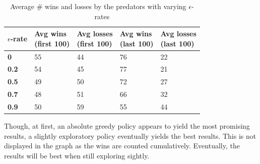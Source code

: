 \begin{table}[H]
\begin{center}
\begin{tabular}{| l | l | l | l | l |}
\hline
\parbox{2cm}{\textbf{$\epsilon$-rate}} & \parbox{2cm}{\textbf{Avg wins \\ (first 100)}} & \parbox{2cm}{\textbf{Avg losses \\ (first 100)}} & \parbox{2cm}{\textbf{Avg wins \\ (last 100)}} & \parbox{2cm}{\textbf{Avg losses \\ (last 100)}} \\
\hline
\textbf{0} & 55 & 44 & 76 & 22 \\
\hline
\textbf{0.2} & 54 & 45 & 77 & 21 \\
\hline
\textbf{0.5} & 49 & 50 & 72 & 27 \\
\hline
\textbf{0.7} & 48 & 51 & 66 & 32 \\
\hline
\textbf{0.9} & 50 & 59 & 55 & 44 \\
\hline
\end{tabular}
\caption{Average \# wins and losses by the predators with varying $\epsilon$-rates}
\end{center}
\end{table}

Though, at first, an absolute greedy policy appears to yield the most promising results, a slightly exploratory policy eventually yields the best results. This is not displayed in the graph as the wins are counted cumulatively. Eventually, the results will be best when still exploring sightly.